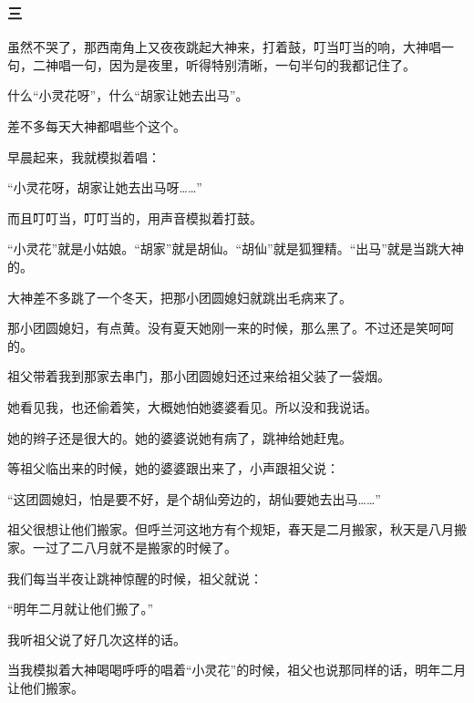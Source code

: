 \subsubsection*{三}
\par 虽然不哭了，那西南角上又夜夜跳起大神来，打着鼓，叮当叮当的响，大神唱一句，二神唱一句，因为是夜里，听得特别清晰，一句半句的我都记住了。
\par 什么“小灵花呀”，什么“胡家让她去出马”。
\par 差不多每天大神都唱些个这个。
\par 早晨起来，我就模拟着唱：
\par “小灵花呀，胡家让她去出马呀……”
\par 而且叮叮当，叮叮当的，用声音模拟着打鼓。
\par “小灵花”就是小姑娘。“胡家”就是胡仙。“胡仙”就是狐狸精。“出马”就是当跳大神的。
\par 大神差不多跳了一个冬天，把那小团圆媳妇就跳出毛病来了。
\par 那小团圆媳妇，有点黄。没有夏天她刚一来的时候，那么黑了。不过还是笑呵呵的。
\par 祖父带着我到那家去串门，那小团圆媳妇还过来给祖父装了一袋烟。
\par 她看见我，也还偷着笑，大概她怕她婆婆看见。所以没和我说话。
\par 她的辫子还是很大的。她的婆婆说她有病了，跳神给她赶鬼。
\par 等祖父临出来的时候，她的婆婆跟出来了，小声跟祖父说：
\par “这团圆媳妇，怕是要不好，是个胡仙旁边的，胡仙要她去出马……”
\par 祖父很想让他们搬家。但呼兰河这地方有个规矩，春天是二月搬家，秋天是八月搬家。一过了二八月就不是搬家的时候了。
\par 我们每当半夜让跳神惊醒的时候，祖父就说：
\par “明年二月就让他们搬了。”
\par 我听祖父说了好几次这样的话。
\par 当我模拟着大神喝喝呼呼的唱着“小灵花”的时候，祖父也说那同样的话，明年二月让他们搬家。
